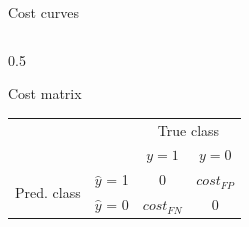 \documentclass[11pt,compress,t,notes=noshow, xcolor=table]{beamer}
\begin{document}
\begin{vbframe}{Cost curves}
\begin{columns}[T]
\begin{column}{0.5\textwidth}
\centerline{Cost matrix}
\begin{tabular}{cc|cc}
    & &\multicolumn{2}{c}{True class} \\
    & & $y=1$ & $y=0$  \\
 \hline
    \multirow{2}{*}{\parbox{0.5cm}{Pred. class}}& $\hat y$ = 1     & 0                 & $cost_{FP}$\\
    & $\hat y$ = 0 & $cost_{FN}$              & 0\\
\end{tabular}

\end{column}
\end{columns}



\end{vbframe}
\end{document}
